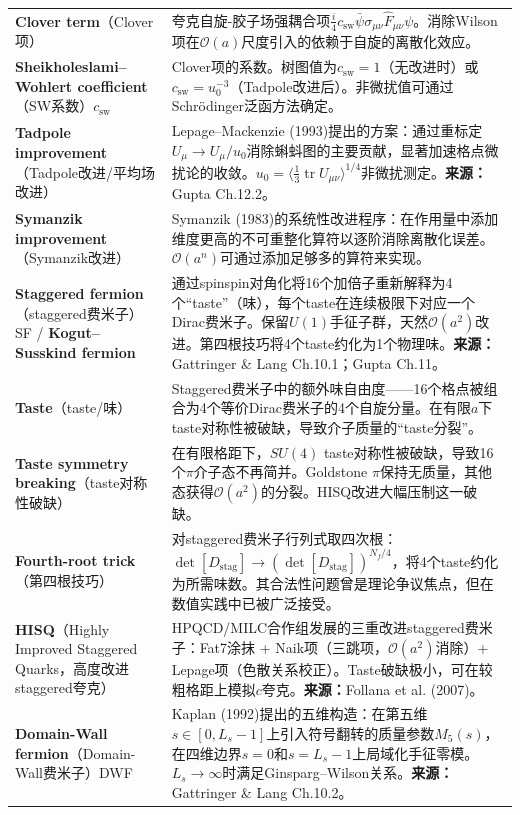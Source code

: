 \documentclass[12pt,a4paper]{ctexart}
\begin{document}
\begin{longtable}{p{3.5cm}p{9cm}}
\textbf{Clover term}（Clover项）& 夸克自旋-胶子场强耦合项$\frac{i}{4}c_{\text{sw}}\bar\psi\sigma_{\mu\nu}\hat F_{\mu\nu}\psi$。消除Wilson项在$\mathcal{O}(a)$尺度引入的依赖于自旋的离散化效应。\\
\textbf{Sheikholeslami--Wohlert coefficient}（SW系数）$c_{\text{sw}}$& Clover项的系数。树图值为$c_{\text{sw}}=1$（无改进时）或$c_{\text{sw}}=u_0^{-3}$（Tadpole改进后）。非微扰值可通过Schr\"odinger泛函方法确定。\\
\textbf{Tadpole improvement}（Tadpole改进/平均场改进）& Lepage--Mackenzie (1993)提出的方案：通过重标定$U_\mu \to U_\mu/u_0$消除蝌蚪图的主要贡献，显著加速格点微扰论的收敛。$u_0 = \langle \frac{1}{3}\operatorname{tr}U_{\mu\nu}\rangle^{1/4}$非微扰测定。\textbf{来源：}Gupta Ch.12.2。\\
\textbf{Symanzik improvement}（Symanzik改进）& Symanzik (1983)的系统性改进程序：在作用量中添加维度更高的不可重整化算符以逐阶消除离散化误差。$\mathcal{O}(a^n)$可通过添加足够多的算符来实现。\\
\textbf{Staggered fermion}（staggered费米子）SF / \textbf{Kogut--Susskind fermion}& 通过spinspin对角化将16个加倍子重新解释为4个``taste''（味），每个taste在连续极限下对应一个Dirac费米子。保留$U(1)$手征子群，天然$\mathcal{O}(a^2)$改进。第四根技巧将4个taste约化为1个物理味。\textbf{来源：}Gattringer \& Lang Ch.10.1；Gupta Ch.11。\\
\textbf{Taste}（taste/味）& Staggered费米子中的额外味自由度——16个格点被组合为4个等价Dirac费米子的4个自旋分量。在有限$a$下taste对称性被破缺，导致介子质量的``taste分裂''。\\
\textbf{Taste symmetry breaking}（taste对称性破缺）& 在有限格距下，$SU(4)$ taste对称性被破缺，导致16个$\pi$介子态不再简并。Goldstone $\pi$保持无质量，其他态获得$\mathcal{O}(a^2)$的分裂。HISQ改进大幅压制这一破缺。\\
\textbf{Fourth-root trick}（第四根技巧）& 对staggered费米子行列式取四次根：$\det[D_{\text{stag}}] \to (\det[D_{\text{stag}}])^{N_f/4}$，将4个taste约化为所需味数。其合法性问题曾是理论争议焦点，但在数值实践中已被广泛接受。\\
\textbf{HISQ}（Highly Improved Staggered Quarks，高度改进staggered夸克）& HPQCD/MILC合作组发展的三重改进staggered费米子：Fat7涂抹 + Naik项（三跳项，$\mathcal{O}(a^2)$消除）+ Lepage项（色散关系校正）。Taste破缺极小，可在较粗格距上模拟$c$夸克。\textbf{来源：}Follana et al. (2007)。\\
\textbf{Domain-Wall fermion}（Domain-Wall费米子）DWF& Kaplan (1992)提出的五维构造：在第五维$s\in[0,L_s-1]$上引入符号翻转的质量参数$M_5(s)$，在四维边界$s=0$和$s=L_s-1$上局域化手征零模。$L_s\to\infty$时满足Ginsparg--Wilson关系。\textbf{来源：}Gattringer \& Lang Ch.10.2。\\

\end{longtable}
\end{document}

